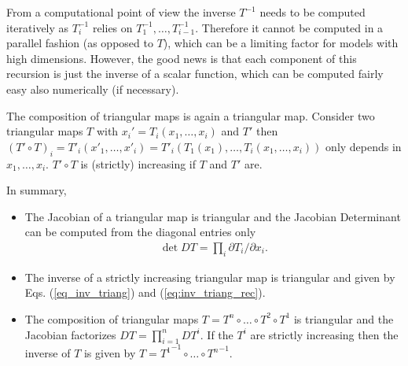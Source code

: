 \documentclass[12pt,a4paper]{article}
\begin{document}
From a computational point of view the inverse $T^{-1}$ needs to be computed iteratively as $T^{-1}_i$ relies on $T^{-1}_{1}, \dots, T^{-1}_{i-1}$. Therefore it cannot be computed in a parallel fashion (as opposed to $T$), which can be a limiting factor for models with high dimensions. However, the good news is that each component of this recursion is just the inverse of a scalar function, which can be computed fairly easy also numerically (if necessary).


The composition of triangular maps is again a triangular map. Consider two triangular maps $T$ with $x_i' = T_i(x_1, \dots, x_i)$ and $T'$ then $(T'\circ T)_i = T'_i(x'_1, \dots, x'_i) = T'_i(T_1(x_1), \dots, T_i(x_1, \dots, x_i))$ only depends in $x_1, \dots, x_i$. $T'\circ T$ is (strictly) increasing if $T$ and $T'$ are.

In summary,
\begin{itemize}
	\item The Jacobian of a triangular map is triangular and the Jacobian Determinant can be computed from the diagonal entries only
	\begin{align} \label{eq:jac_triangular}
		\det DT = \prod_i \partial T_i /\partial x_i.
	\end{align} 
	\item The inverse of  a strictly increasing triangular map is triangular and given by Eqs. (\ref{eq_inv_triang}) and (\ref{eq:inv_triang_rec}).
	\item The composition of triangular maps $T = T^n \circ \dots \circ T^2 \circ T^1 $ is triangular and the Jacobian  factorizes $DT = \prod_{i=1}^{n} DT^i $. If the $T^i$ are strictly increasing then the inverse of $T$  is given by $T = {T^{1}}^{-1} \circ \dots  \circ {T^{n}}^{-1}$. 
\end{itemize}

 
\end{document}
